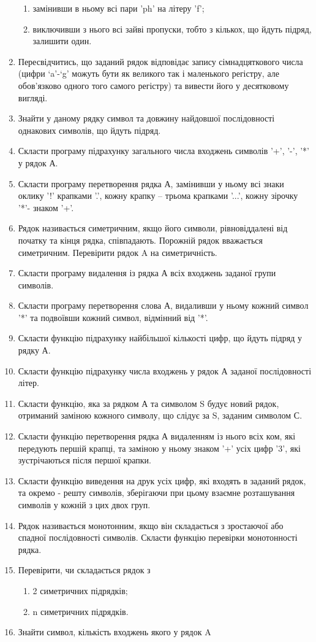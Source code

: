 \documentclass[]{article}
\makeatletter
\newcommand{\xslalph}[1]{\expandafter\@xslalph\csname c@#1\endcsname}
\newcommand{\@xslalph}[1]{%
    \ifcase#1\or а\or б\or в\or г\or д\or e\or є\or ж\or з\or i%
    \or й\or к\or л\or м\or н\or о\or п\or р\or с\or т%
    \or у\or ф\or х\or ц\or ч\or ш\or ю\or я\or аа\or бб\or вв %
    \else\@ctrerr\fi%
}
\makeatother
\begin{document}
\begin{enumerate}
\begin{enumerate}[label=\xslalph*)]
\item замінивши в ньому всі пари 'ph' на літеру 'f';
\item виключивши з нього всі зайві пропуски, тобто з кількох, що йдуть
підряд, залишити один.
\end{enumerate}
\item
Пересвідчитись, що заданий рядок відповідає запису сімнадцяткового числа
(цифри `a'-`g' можуть бути як великого так і маленького регістру, але
обов'язково одного того самого регістру) та вивести його у десятковому
вигляді.
\item
Знайти у даному рядку символ та довжину найдовшої послідовності
однакових символів, що йдуть підряд.
\item
Скласти програму підрахунку загального числа входжень символів '+', '-',
'*' у рядок А.
\item
Скласти програму перетворення рядка А, замінивши у ньому всі знаки
оклику '!' крапками '.', кожну крапку -- трьома крапками '...', кожну
зірочку '*'- знаком '+'.
\item
Рядок називається симетричним, якщо його символи, рівновіддалені від
початку та кінця рядка, співпадають. Порожній рядок вважається
симетричним. Перевірити рядок A на симетричність.
\item
Скласти програму видалення із рядка А всіх входжень заданої групи
символів.
\item
Скласти програму перетворення слова А, видаливши у ньому кожний символ
'*' та подвоївши кожний символ, відмінний від '*'.
\item
Скласти функцію підрахунку найбільшої кількості цифр, що йдуть підряд у
рядку А.
\item
Скласти функцію підрахунку числа входжень у рядок А заданої
послідовності літер.
\item
Скласти функцію, яка за рядком А та символом S будує новий рядок,
отриманий заміною кожного символу, що слідує за S, заданим символом С.
\item
Скласти функцію перетворення рядка А видаленням із нього всіх ком, які
передують першій крапці, та заміною у ньому знаком '+' усіх цифр '3',
які зустрічаються після першої крапки.
\item
Скласти функцію виведення на друк усіх цифр, які входять в заданий
рядок, та окремо - решту символів, зберігаючи при цьому взаємне
розташування символів у кожній з цих двох груп.
\item
Рядок називається монотонним, якщо він складається з зростаючої або
спадної послідовності символів. Скласти функцію перевірки монотонності
рядка.
\item
Перевірити, чи складається рядок з
\begin{enumerate}[label=\xslalph*)]
\item
2 симетричних підрядків;
\item n симетричних підрядків.
\end{enumerate}
\item
Знайти символ, кількість входжень якого у рядок A


\end{enumerate}
\end{document}
